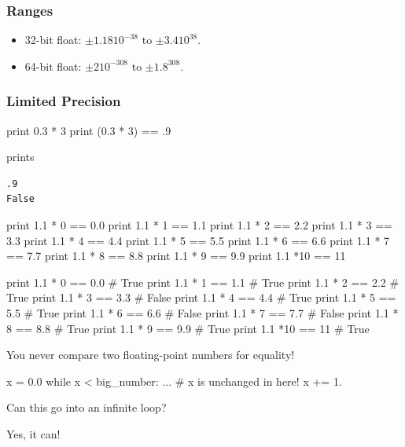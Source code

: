 \begin{frame}[fragile]
\frametitle{Ranges}

\begin{itemize}
\item 32-bit float: $\pm 1.18 10^{-38}$ to $\pm 3.4 10^{38}$.
\item 64-bit float: $\pm 2 10^{-308}$ to $\pm 1.8 ^{308}$.
\end{itemize}
\end{frame}

\begin{frame}[fragile]
\frametitle{Limited Precision}

\begin{python}

print 0.3 * 3
print (0.3 * 3) == .9
\end{python}
prints
\begin{verbatim}
.9
False
\end{verbatim}
\end{frame}

\begin{frame}[fragile]
\begin{python}
print 1.1 * 0 == 0.0  
print 1.1 * 1 == 1.1  
print 1.1 * 2 == 2.2 
print 1.1 * 3 == 3.3 
print 1.1 * 4 == 4.4 
print 1.1 * 5 == 5.5 
print 1.1 * 6 == 6.6 
print 1.1 * 7 == 7.7 
print 1.1 * 8 == 8.8 
print 1.1 * 9 == 9.9 
print 1.1 *10 == 11 
\end{python}
\end{frame}

\begin{frame}[fragile]
\begin{python}
print 1.1 * 0 == 0.0    #  True
print 1.1 * 1 == 1.1    #  True
print 1.1 * 2 == 2.2    #  True
print 1.1 * 3 == 3.3    #  False
print 1.1 * 4 == 4.4    #  True
print 1.1 * 5 == 5.5    #  True
print 1.1 * 6 == 6.6    #  False
print 1.1 * 7 == 7.7    #  False
print 1.1 * 8 == 8.8    #  True
print 1.1 * 9 == 9.9    #  True
print 1.1 *10 == 11     #  True
\end{python}
\end{frame}

\begin{frame}[fragile]
You never compare two floating-point numbers for equality!
\end{frame}

\begin{frame}[fragile]

\begin{python}
x = 0.0
while x < big_number:
    ... # x is unchanged in here!
    x += 1.
\end{python}

Can this go into an infinite loop?

\pause
Yes, it can!
\end{frame}


